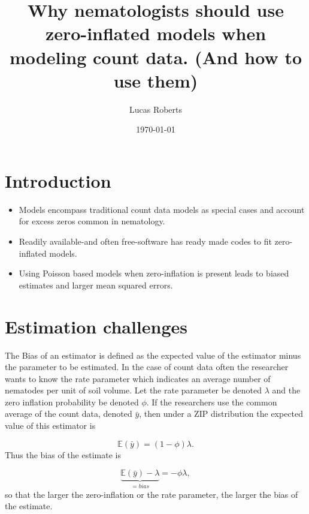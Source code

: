\documentclass{article}
\author{Lucas Roberts}
\date{\today}
\begin{document}
\title{
Why nematologists should use zero-inflated models when modeling count data. (And how to use them)
}

\maketitle

\section{Introduction}


\begin{itemize}
\item Models encompass traditional count data models as special cases and account for excess zeros common in nematology. 
\item Readily available-and often free-software has ready made codes to fit zero-inflated models. 
\item Using Poisson based models when zero-inflation is present leads to biased estimates and larger mean squared errors.   
\end{itemize}

\section{Estimation challenges}

The Bias of an estimator is defined as the expected value of the estimator minus the parameter to be estimated. In the case of count data often the researcher wants to know the rate parameter which indicates an average number of nematodes per unit of soil volume. Let the rate parameter be denoted $\lambda$ and the zero inflation probability be denoted $\phi$. If the researchers use the common average of the count data, denoted $\bar{y}$, then under a ZIP distribution the expected value of this estimator is 

\begin{equation}
\mathbb{E}(\bar{y}) = (1-\phi)\lambda.
\end{equation}
Thus the bias of the estimate is 

\begin{equation}
\underbrace{\mathbb{E}(\bar{y}) - \lambda}_{=bias} = -\phi\lambda,
\end{equation}
so that the larger the zero-inflation or the rate parameter, the larger the bias of the estimate. 
\end{document}
